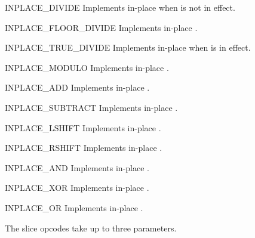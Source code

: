 \begin{opcodedesc}{INPLACE_DIVIDE}{}
Implements in-place  when
 is not in effect.
\end{opcodedesc}

\begin{opcodedesc}{INPLACE_FLOOR_DIVIDE}{}
Implements in-place .
\end{opcodedesc}

\begin{opcodedesc}{INPLACE_TRUE_DIVIDE}{}
Implements in-place  when
 is in effect.
\end{opcodedesc}

\begin{opcodedesc}{INPLACE_MODULO}{}
Implements in-place .
\end{opcodedesc}

\begin{opcodedesc}{INPLACE_ADD}{}
Implements in-place .
\end{opcodedesc}

\begin{opcodedesc}{INPLACE_SUBTRACT}{}
Implements in-place .
\end{opcodedesc}

\begin{opcodedesc}{INPLACE_LSHIFT}{}
Implements in-place .
\end{opcodedesc}

\begin{opcodedesc}{INPLACE_RSHIFT}{}
Implements in-place .
\end{opcodedesc}

\begin{opcodedesc}{INPLACE_AND}{}
Implements in-place .
\end{opcodedesc}

\begin{opcodedesc}{INPLACE_XOR}{}
Implements in-place .
\end{opcodedesc}

\begin{opcodedesc}{INPLACE_OR}{}
Implements in-place .
\end{opcodedesc}

The slice opcodes take up to three parameters.

